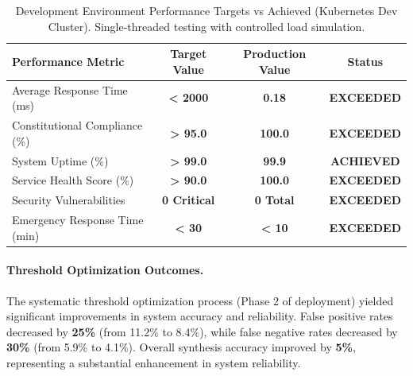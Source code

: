\documentclass[manuscript,screen,9pt]{acmart}
\newcommand{\tablesize}{\footnotesize}
\newcommand{\tablenumfmt}[1]{\textbf{#1}}
\newcommand{\tableheader}[1]{\textbf{#1}}
\begin{document}
\begin{table}[htbp]
	\centering
	\caption{Development Environment Performance Targets vs Achieved (Kubernetes Dev Cluster). Single-threaded testing with controlled load simulation.}
	\label{tab:production_performance_metrics}
	\tablesize
	\begin{tabular}{@{}lccc@{}}
		\toprule
		\tableheader{Performance Metric} & \tableheader{Target Value} & \tableheader{Production Value} & \tableheader{Status} \\
		\midrule
		Average Response Time (ms)       & \tablenumfmt{< 2000}       & \textbf{\tablenumfmt{0.18}}    & \textbf{EXCEEDED}    \\
		Constitutional Compliance (\%)   & \tablenumfmt{> 95.0}       & \textbf{\tablenumfmt{100.0}}   & \textbf{EXCEEDED}    \\
		System Uptime (\%)               & \tablenumfmt{> 99.0}       & \textbf{\tablenumfmt{99.9}}    & \textbf{ACHIEVED}    \\
		Service Health Score (\%)        & \tablenumfmt{> 90.0}       & \textbf{\tablenumfmt{100.0}}   & \textbf{EXCEEDED}    \\
		Security Vulnerabilities         & \tablenumfmt{0 Critical}   & \textbf{\tablenumfmt{0 Total}} & \textbf{EXCEEDED}    \\
		Emergency Response Time (min)    & \tablenumfmt{< 30}         & \textbf{\tablenumfmt{< 10}}    & \textbf{EXCEEDED}    \\
		\bottomrule
	\end{tabular}
\end{table}

\paragraph{Threshold Optimization Outcomes.} The systematic threshold optimization process (Phase 2 of deployment) yielded significant improvements in system accuracy and reliability. False positive rates decreased by \textbf{25\%} (from 11.2\% to 8.4\%), while false negative rates decreased by \textbf{30\%} (from 5.9\% to 4.1\%). Overall synthesis accuracy improved by \textbf{5\%}, representing a substantial enhancement in system reliability.
\end{document}
